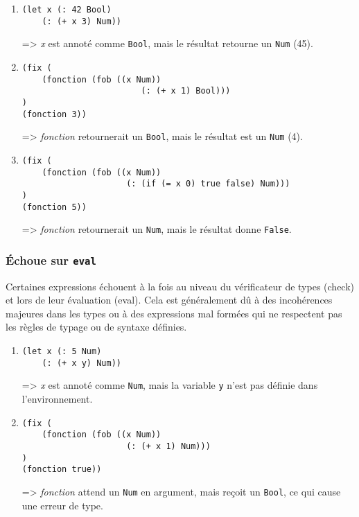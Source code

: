 \documentclass[a4paper,12pt]{article}
\begin{document}
        \begin{enumerate}
            \item \begin{lstlisting}
(let x (: 42 Bool) 
    (: (+ x 3) Num))
            \end{lstlisting}
            => \textit{x} est annoté comme \texttt{Bool}, mais le résultat retourne un \texttt{Num} (45).
        
            \item \begin{lstlisting}
(fix (
    (fonction (fob ((x Num)) 
                        (: (+ x 1) Bool)))
) 
(fonction 3))
            \end{lstlisting}
            => \textit{fonction} retournerait un \texttt{Bool}, mais le résultat est un \texttt{Num} (4).
        
            \item \begin{lstlisting}
(fix (
    (fonction (fob ((x Num)) 
                     (: (if (= x 0) true false) Num)))
) 
(fonction 5))
            \end{lstlisting}
            => \textit{fonction} retournerait un \texttt{Num}, mais le résultat donne \texttt{False}.
        \end{enumerate}

        \subsubsection{Échoue sur \texttt{eval}}
        Certaines expressions échouent à la fois au niveau du vérificateur de types (check) et lors de leur évaluation (eval). 
        Cela est généralement dû à des incohérences majeures dans les types ou à des expressions mal formées qui ne respectent pas 
        les règles de typage ou de syntaxe définies. \\
        \begin{enumerate}
            \item \begin{lstlisting}
(let x (: 5 Num) 
    (: (+ x y) Num))
            \end{lstlisting}
            => \textit{x} est annoté comme \texttt{Num}, mais la variable \texttt{y} n'est pas définie dans l'environnement.
        
            \item \begin{lstlisting}
(fix (
    (fonction (fob ((x Num)) 
                     (: (+ x 1) Num)))
) 
(fonction true))
            \end{lstlisting}
            => \textit{fonction} attend un \texttt{Num} en argument, mais reçoit un \texttt{Bool}, ce qui cause une erreur de type.
        \end{enumerate}
\end{document}
